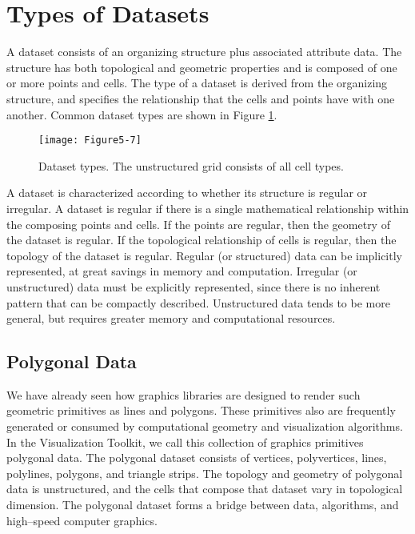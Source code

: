 
\section{Types of Datasets}
\label{sec:types_of_datasets}

A dataset consists of an organizing structure plus associated attribute data. The structure has both topological and geometric properties and is composed of one or more points and cells. The type of a dataset is derived from the organizing structure, and specifies the relationship that the cells and points have with one another. Common dataset types are shown in Figure \ref{fig:Figure5-7}.

\begin{figure}[!htb]
	\centering
	\texttt{[image: Figure5-7]}
	\caption{Dataset types. The unstructured grid consists of all cell types.}
	\label{fig:Figure5-7}
\end{figure}

A dataset is characterized according to whether its structure is regular or irregular. A dataset is regular if there is a single mathematical relationship within the composing points and cells. If the points are regular, then the geometry of the dataset is regular. If the topological relationship of cells is regular, then the topology of the dataset is regular. Regular (or structured) data can be implicitly represented, at great savings in memory and computation. Irregular (or unstructured) data must be explicitly represented, since there is no inherent pattern that can be compactly described. Unstructured data tends to be more general, but requires greater memory and computational resources.

\subsection{Polygonal Data}

We have already seen how graphics libraries are designed to render such geometric primitives as lines and polygons. These primitives also are frequently generated or consumed by computational geometry and visualization algorithms. In the Visualization Toolkit, we call this collection of graphics primitives polygonal data. The polygonal dataset consists of vertices, polyvertices, lines, polylines, polygons, and triangle strips. The topology and geometry of polygonal data is unstructured, and the cells that compose that dataset vary in topological dimension. The polygonal dataset forms a bridge between data, algorithms, and high--speed computer graphics.

